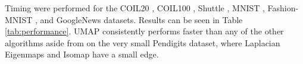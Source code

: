 \documentclass[12pt]{article}
\begin{document}
Timing were performed for the COIL20 \cite{COIL20}, COIL100 \cite{COIL100}, Shuttle \cite{UCI}, MNIST \cite{mnistlecun}, Fashion-MNIST \cite{xiao2017}, and GoogleNews \cite{mikolov2013distributed} datasets. Results can be seen in Table \ref{tab:performance}. UMAP consistently performs faster than any of the other algorithms aside from on the very small Pendigits dataset, where Laplacian Eigenmaps and Isomap have a small edge.




\end{document}
